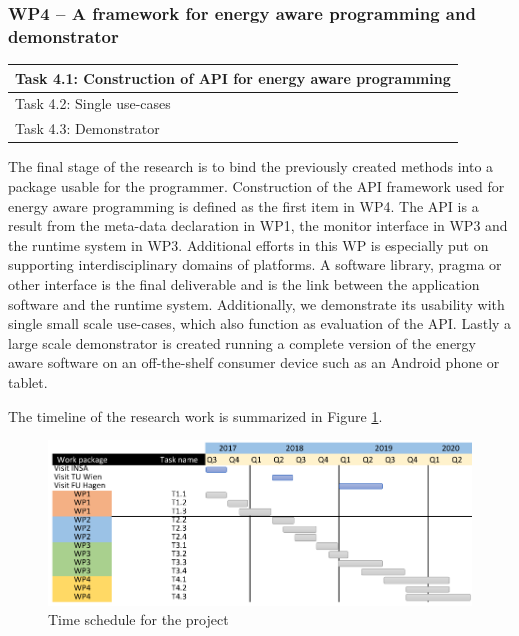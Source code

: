 \documentclass{article}
\begin{document}
\subsubsection{WP4 -- A framework for energy aware programming and demonstrator}
\begin{table}
\vspace{-0.5cm}
\small
\begin{tabular}{ | l |}
\hline
Task 4.1: Construction of API for energy aware programming\\ \hline
Task 4.2: Single use-cases \\ \hline
Task 4.3: Demonstrator\\ \hline
\end{tabular}
\vspace{-0.3cm}
\end{table}
The final stage of the research is to bind the previously created methods into a package usable for the programmer.
Construction of the API framework used for energy aware programming is defined as the first item in WP4.
The API is a result from the meta-data declaration in WP1, the monitor interface in WP3 and the runtime system in WP3.
Additional efforts in this WP is especially put on supporting interdisciplinary domains of platforms.
A software library, pragma or other interface is the final deliverable and is the link between the application software and the runtime system.
Additionally, we demonstrate its usability with single small scale use-cases, which also function as evaluation of the API.
Lastly a large scale demonstrator is created running a complete version of the energy aware software on an off-the-shelf consumer device such as an Android phone or tablet.

The timeline of the research work is summarized in Figure \ref{fig:schedule}.
\begin{figure}[h]
	\centering
	\includegraphics[scale=0.45]{fig/schedule.png}
	\caption{Time schedule for the project}
	\label{fig:schedule}
\end{figure}
\end{document}
